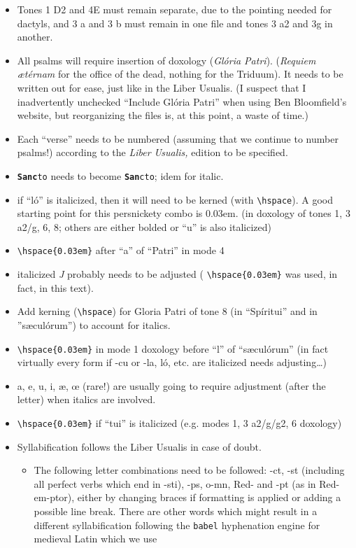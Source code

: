 \documentclass[11pt]{article}
\begin{document}
\begin{itemize}
\item Tones 1 D2 and 4E must remain separate, due to the pointing needed for dactyls, and 3 a and 3 b must remain in one file and tones 3 a2 and 3g in another.
  \item All psalms will require insertion of doxology (\textit{Glória Patri}). (\textit{Requiem ætérnam} for the office of the dead, nothing for the Triduum). It needs to be written out for ease, just like in the Liber Usualis. (I suspect that I inadvertently unchecked ``Include Glória Patri'' when using Ben Bloomfield's website, but reorganizing the files is, at this point, a waste of time.)
 \item Each ``verse'' needs to be numbered (assuming that we continue to number psalms!) according to the \textit{Liber Usualis,} edition to be specified.
 \item \texttt{\textbf{Sanc}to} needs to become \texttt{\textbf{San}cto}; idem for italic.
 \item
 if ``ló'' is italicized, then it will need to be kerned (with \verb|\hspace|). A good starting point for this persnickety combo is 0.03em. (in doxology of tones 1, 3 a2/g, 6, 8; others are either bolded or ``u'' is also italicized)
  \item \verb|\hspace{0.03em}| after ``a'' of ``Patri'' in mode 4
  \item italicized \hspace{0.03em}\textit{J} probably needs to be adjusted ( \verb|\hspace{0.03em}| was used, in fact, in this text).
  \item
  Add kerning (\verb|\hspace|) for Gloria Patri of tone 8 (in ``Spíritui'' and in ''sæculórum'') to account for italics.
   \item  \verb|\hspace{0.03em}| in mode 1 doxology before ``l'' of ``sæculórum'' (in fact virtually every form if -cu or -la, ló, etc. are italicized needs adjusting…)
   \item a, e, u, i, æ, œ (rare!) are usually going to require adjustment (after the letter) when italics are involved.
   \item  \verb|\hspace{0.03em}| if ``tui'' is italicized (e.g. modes 1, 3 a2/g/g2, 6 doxology)
   \item
   Syllabification follows the Liber Usualis in case of doubt.
   \begin{itemize}
   \item
  The following letter combinations need to be followed: -ct, -st (including all perfect verbs which end in -sti), -ps, o-mn, Red- and -pt (as in Red-em-ptor), either by changing braces if formatting is applied or adding a possible line break. There are other words which might result in a different syllabification following the \verb|babel| hyphenation engine for medieval Latin which we use
\end{itemize}
\end{itemize}
\end{document}
